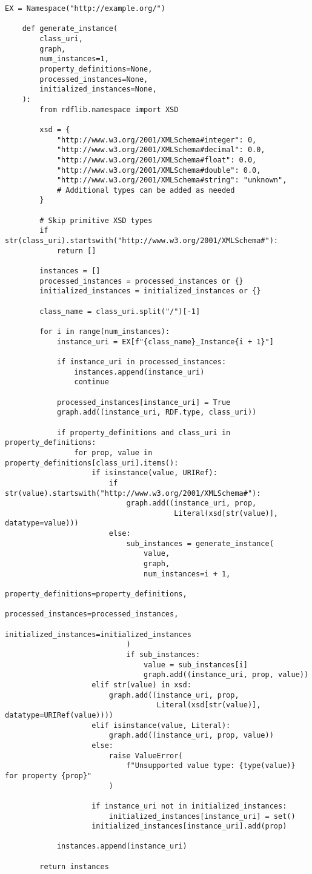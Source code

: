 \begin{lstlisting}[caption={Instance Generation Function}, label={lst:generate_instance}]
	EX = Namespace("http://example.org/")
	
	def generate_instance(
		class_uri,
		graph,
		num_instances=1,
		property_definitions=None,
		processed_instances=None,
		initialized_instances=None,
	):
		from rdflib.namespace import XSD
	
		xsd = {
			"http://www.w3.org/2001/XMLSchema#integer": 0,
			"http://www.w3.org/2001/XMLSchema#decimal": 0.0,
			"http://www.w3.org/2001/XMLSchema#float": 0.0,
			"http://www.w3.org/2001/XMLSchema#double": 0.0,
			"http://www.w3.org/2001/XMLSchema#string": "unknown",
			# Additional types can be added as needed
		}
	
		# Skip primitive XSD types
		if str(class_uri).startswith("http://www.w3.org/2001/XMLSchema#"):
			return []
	
		instances = []
		processed_instances = processed_instances or {}
		initialized_instances = initialized_instances or {}
	
		class_name = class_uri.split("/")[-1]
	
		for i in range(num_instances):
			instance_uri = EX[f"{class_name}_Instance{i + 1}"]
	
			if instance_uri in processed_instances:
				instances.append(instance_uri)
				continue
	
			processed_instances[instance_uri] = True
			graph.add((instance_uri, RDF.type, class_uri))
	
			if property_definitions and class_uri in property_definitions:
				for prop, value in property_definitions[class_uri].items():
					if isinstance(value, URIRef):
						if str(value).startswith("http://www.w3.org/2001/XMLSchema#"):
							graph.add((instance_uri, prop,
									   Literal(xsd[str(value)], datatype=value)))
						else:
							sub_instances = generate_instance(
								value,
								graph,
								num_instances=i + 1,
								property_definitions=property_definitions,
								processed_instances=processed_instances,
								initialized_instances=initialized_instances
							)
							if sub_instances:
								value = sub_instances[i]
								graph.add((instance_uri, prop, value))
					elif str(value) in xsd:
						graph.add((instance_uri, prop,
								   Literal(xsd[str(value)], datatype=URIRef(value))))
					elif isinstance(value, Literal):
						graph.add((instance_uri, prop, value))
					else:
						raise ValueError(
							f"Unsupported value type: {type(value)} for property {prop}"
						)
	
					if instance_uri not in initialized_instances:
						initialized_instances[instance_uri] = set()
					initialized_instances[instance_uri].add(prop)
	
			instances.append(instance_uri)
	
		return instances
\end{lstlisting}

